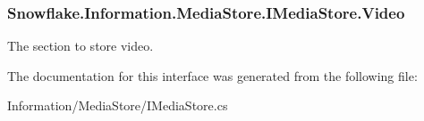 \subsubsection[{Video}]{ Snowflake.\+Information.\+Media\+Store.\+I\+Media\+Store.\+Video\hspace{0.3cm}{\ttfamily [get]}}\label{interface_snowflake_1_1_information_1_1_media_store_1_1_i_media_store_a0d8d5f35916dad519af29f96c5015225}


The section to store video. 



The documentation for this interface was generated from the following file\+:\begin{DoxyCompactItemize}
\item 
Information/\+Media\+Store/I\+Media\+Store.\+cs\end{DoxyCompactItemize}
